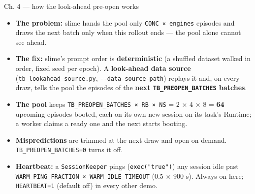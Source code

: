 \documentclass[
  10pt,
  ignorenonframetext,
  aspectratio=169,
  t]{beamer}
\providecommand{\tightlist}{%
  \setlength{\itemsep}{0pt}\setlength{\parskip}{0pt}}
\begin{document}
\begin{frame}{Ch. 4 --- how the look-ahead pre-open works}
\protect\hypertarget{ch.-4-how-the-look-ahead-pre-open-works}{}
\begin{itemize}
\tightlist
\item
  \textbf{The problem:} slime hands the pool only
  \texttt{CONC\ ×\ engines} episodes and draws the next batch only when
  this rollout ends --- the pool alone cannot see ahead.
\item
  \textbf{The fix:} slime's prompt order is \textbf{deterministic} (a
  shuffled dataset walked in order, fixed seed per epoch). A
  \textbf{look-ahead data source} (\texttt{tb\_lookahead\_source.py},
  \texttt{-\/-data-source-path}) replays it and, on every draw, tells
  the pool the episodes of the \textbf{next
  \texttt{TB\_PREOPEN\_BATCHES} batches}.
\item
  \textbf{The pool} keeps \texttt{TB\_PREOPEN\_BATCHES\ ×\ RB\ ×\ NS} =
  2 × 4 × 8 = \textbf{64} upcoming episodes booted, each on its own new
  session on its task's Runtime; a worker claims a ready one and the
  next starts booting.
\item
  \textbf{Mispredictions} are trimmed at the next draw and open on
  demand. \texttt{TB\_PREOPEN\_BATCHES=0} turns it off.
\item
  \textbf{Heartbeat:} a \texttt{SessionKeeper} pings
  (\texttt{exec("true")}) any session idle past
  \texttt{WARM\_PING\_FRACTION\ ×\ WARM\_IDLE\_TIMEOUT} (0.5 × 900 s).
  Always on here; \texttt{HEARTBEAT=1} (default off) in every other
  demo.
\end{itemize}
\end{frame}
\end{document}
